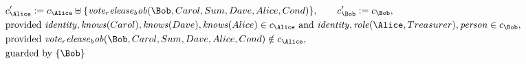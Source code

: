 \begin{align*}
&
c'_
{
\Alice
}
 := 
c_
{
\Alice
}
 \uplus 
\{
\mathit{
vote_release_bob
}
(
\Bob
,
Carol
,
Sum
,
Dave
,
Alice
,
Cond
)
\}
, \qquad 
c'_
{
\Bob
}
 := 
c_
{
\Bob
}
,\\
&
\text{provided } 
\mathit{
identity
}
,
\mathit{
knows
}
(
Carol
)
,
\mathit{
knows
}
(
Dave
)
,
\mathit{
knows
}
(
Alice
)
 \in c_
{
\Alice
}
 \text{ and } 
\mathit{
identity
}
,
\mathit{
role
}
(
\Alice
,
Treasurer
)
,
\mathit{
person
}
 \in c_
{
\Bob
}
,\\
&
\text{provided } 
\mathit{
vote_release_bob
}
(
\Bob
,
Carol
,
Sum
,
Dave
,
Alice
,
Cond
)
 \notin c_
{
\Alice
}
,\\
&
\text{guarded by } \{
\Bob
\}
\end{align*}

